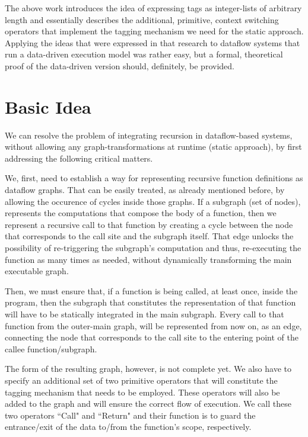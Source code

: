 \documentclass[ack,preface]{dithesis}
\begin{document}
The above work introduces the idea of expressing tags as integer-lists of arbitrary length and essentially describes the additional, primitive, context switching operators that implement the tagging mechanism we need for the static approach. Applying the ideas that were expressed in that research to dataflow systems that run a data-driven execution model was rather easy, but a formal, theoretical proof of the data-driven version should, definitely, be provided.

    \section{Basic Idea}
We can resolve the problem of integrating recursion in dataflow-based systems, without allowing any graph-transformations at runtime (static approach), by first addressing the following critical matters.

We, first, need to establish a way for representing recursive function definitions as dataflow graphs.  That can be easily treated, as already mentioned before, by allowing the occurence of cycles inside those graphs. If a subgraph (set of nodes), represents the computations that compose the body of a function, then we represent a recursive call to that function by creating a cycle between the node that corresponds to the call site and the subgraph itself. That edge unlocks the possibility of  re-triggering the subgraph's computation and thus, re-executing the function as many times as needed, without dynamically transforming the main executable graph.

Then, we must ensure that, if a function is being called, at least once, inside the program, then the subgraph that constitutes the representation of that function will have to be statically integrated in the main subgraph. Every call to that function from the outer-main graph, will be represented from now on, as an edge, connecting the node that corresponds to the call site to the entering point of the callee function/subgraph.

The form of the resulting graph, however, is not complete yet. We also have to specify an additional set of two primitive operators that will constitute the tagging mechanism that needs to be employed. These operators will also be added to the graph and will ensure the correct flow of execution.
We call these two operators ``Call" and ``Return" and their function is to guard the entrance/exit of the data to/from the function's scope, respectively.
\end{document}
